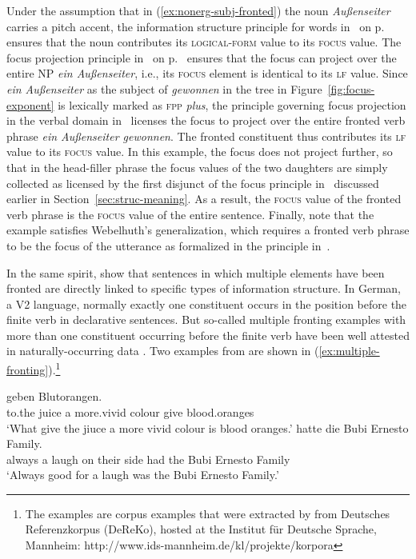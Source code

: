 \documentclass[output=paper
                ,modfonts
                ,nonflat
	        ,collection
	        ,collectionchapter
	        ,collectiontoclongg
 	        ,biblatex
                ,babelshorthands
                ,newtxmath
                ,draftmode
                ,colorlinks, citecolor=brown
]{./langsci/langscibook}
\begin{document}
Under the assumption that in (\ref{ex:nonerg-subj-fronted})
the noun \textit{Außenseiter} carries a pitch accent, the
information structure principle for words in~ on p.~\pageref{fig:words}
ensures that the noun contributes its \textsc{logical-form} value to
its \textsc{focus} value. The focus projection principle in~ on p.~\pageref{fig:focus-projection} ensures that the focus can project
over the entire NP \textit{ein Außenseiter}, i.e., its \textsc{focus}
element is identical to its \textsc{lf} value. Since \textit{ein
  Außenseiter} as the subject of \textit{gewonnen} in the tree in
Figure~\ref{fig:focus-exponent} is lexically marked as \textsc{fpp}
\textit{plus}, the principle governing focus projection in the verbal
domain in~ licenses the focus to
project over the entire fronted verb phrase \textit{ein
  Außenseiter gewonnen}. The fronted constituent thus contributes its
\textsc{lf} value to its \textsc{focus} value. In this example, the
focus does not project further, so that in the head-filler phrase the
focus values of the two daughters are simply collected as licensed by
the first disjunct of the focus principle in~ discussed earlier in
Section~\ref{sec:struc-meaning}. As a result, the \textsc{focus} value
of the fronted verb phrase is the \textsc{focus} value of the
entire sentence. Finally, note that the example satisfies Webelhuth's
generalization, which requires a fronted verb phrase to be the
focus of the utterance as formalized in the principle in~.

In the same spirit, \cite{BC2010a} show that sentences in which
multiple elements have been fronted  are directly linked to specific
types of information structure. In German, a V2 language, normally
exactly one constituent occurs in the position before the finite verb
in declarative sentences. But so-called multiple fronting examples
with more than one constituent occurring before the finite verb have
been well attested in naturally-occurring data \citep{Mueller2003b}. Two examples from
\cite{BC2010a} are shown in (\ref{ex:multiple-fronting}).\footnote{The examples are corpus examples that were extracted by \cite{BC2010a} from Deutsches Referenzkorpus (DeReKo), hosted at the Institut für Deutsche Sprache, Mannheim: http://www.ids-mannheim.de/kl/projekte/korpora}
\begin{exe}
  \ex\label{ex:multiple-fronting}
  \begin{xlist}
    \ex{} geben Blutorangen.\\
             to.the juice a more.vivid colour give blood.oranges\\
      \trans `What give the jiuce a more vivid colour is blood oranges.'
    \ex{} hatte die Bubi Ernesto Family.\\
            always a laugh on their side had the Bubi Ernesto Family\\
        \trans `Always good for a laugh was the Bubi Ernesto Family.'
  \end{xlist}

\end{exe}
\end{document}
